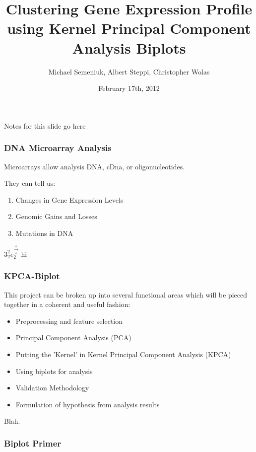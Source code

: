 \documentclass[serif]{beamer}
\title{Clustering Gene Expression Profile using Kernel Principal Component Analysis Biplots}
\author{Michael Semeniuk, Albert Steppi, Christopher Wolas}
\date{February 17th, 2012}
\begin{document}
	\maketitle

	\note
	{
		Notes for this slide go here
	}
	
	\begin{frame}
	\frametitle{DNA Microarray Analysis}

		Microarrays allow analysis DNA, cDna, or oligonucleotides.\newline

		They can tell us:
		\begin{enumerate}
			\item Changes in Gene Expression Levels
			\item Genomic Gains and Losses
			\item Mutations in DNA
		\end{enumerate}


	\note
	{
	   ${ 3 }_{ 2 }^{ 2 }{ e }_{2 }^{ \xrightarrow [  4]{  4}  }$
		hi
	}
	\end{frame}
	
	\begin{frame}
		\frametitle{KPCA-Biplot}

		This project can be broken up into several functional areas which will be pieced together in a coherent and useful fashion:

		\begin{itemize}
			\item Preprocessing and feature selection 
			\item Principal Component Analysis (PCA)
			\item Putting the 'Kernel' in Kernel Principal Component Analysis (KPCA)
			\item Using biplots for analysis
			\item Validation Methodology
			\item Formulation of hypothesis from analysis results
		\end{itemize} 

		\note
		{
			Blah.
		}

	\end{frame}

	\begin{frame} \frametitle{Biplot Primer} \begin{center}  \end{center} \end{frame}
\end{document}
